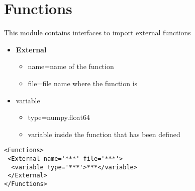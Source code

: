 \section{Functions  \\ \vspace{2 mm} {\small }}

This module contains interfaces to import external functions

\begin{itemize}
\item \textbf{External}
\begin{itemize}
\item name=name of the function
\item file=file name where the function is
\end{itemize}
\item variable
	\begin{itemize}
	\item type=numpy.float64
	\item variable inside the function that has been defined
	\end{itemize}
\end{itemize}






\begin{lstlisting}[style=XML]
<Functions>
 <External name='***' file='***'>
  <variable type='***'>***</variable>
 </External>
</Functions>
\end{lstlisting}



